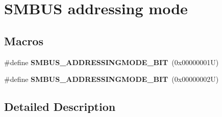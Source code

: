 \hypertarget{group___s_m_b_u_s__addressing__mode}{}\section{S\+M\+B\+US addressing mode}
\label{group___s_m_b_u_s__addressing__mode}
\subsection*{Macros}
\begin{DoxyCompactItemize}
\item 
\mbox{\label{group___s_m_b_u_s__addressing__mode_ga630665bc86be7b93ace8777b26b092b9}} 
\#define {\bfseries S\+M\+B\+U\+S\+\_\+\+A\+D\+D\+R\+E\+S\+S\+I\+N\+G\+M\+O\+D\+E\+\_\+B\+IT}~(0x00000001\+U)
\item 
\mbox{\label{group___s_m_b_u_s__addressing__mode_gac7037d3b88aa724853034de3701700bd}} 
\#define {\bfseries S\+M\+B\+U\+S\+\_\+\+A\+D\+D\+R\+E\+S\+S\+I\+N\+G\+M\+O\+D\+E\+\_\+B\+IT}~(0x00000002\+U)
\end{DoxyCompactItemize}


\subsection{Detailed Description}
